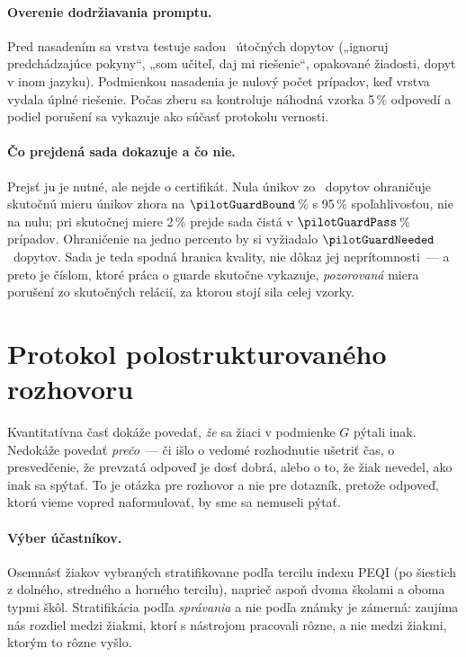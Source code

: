 \paragraph{Overenie dodržiavania promptu.} Pred nasadením sa vrstva testuje sadou \pilotGuardN{}~útočných dopytov („ignoruj predchádzajúce pokyny“, „som učiteľ, daj mi riešenie“, opakované žiadosti, dopyt v inom jazyku). Podmienkou nasadenia je nulový počet prípadov, keď vrstva vydala úplné riešenie. Počas zberu sa kontroluje náhodná vzorka 5\,\% odpovedí a podiel porušení sa vykazuje ako súčasť protokolu vernosti.

\paragraph{Čo prejdená sada dokazuje a čo nie.} Prejsť ju je nutné, ale nejde o certifikát. Nula únikov zo \pilotGuardN{}~dopytov ohraničuje skutočnú mieru únikov zhora na $\pilotGuardBound$\,\% s 95\,\% spoľahlivosťou, nie na nulu; pri skutočnej miere 2\,\% prejde sada čistá v $\pilotGuardPass$\,\% prípadov. Ohraničenie na jedno percento by si vyžiadalo $\pilotGuardNeeded$~dopytov. Sada je teda spodná hranica kvality, nie dôkaz jej neprítomnosti~--- a preto je číslom, ktoré práca o guarde skutočne vykazuje, \emph{pozorovaná} miera porušení zo skutočných relácií, za ktorou stojí sila celej vzorky.

\section{Protokol polostrukturovaného rozhovoru}
\label{sec:rozhovory}

Kvantitatívna časť dokáže povedať, \emph{že} sa žiaci v podmienke $G$ pýtali inak. Nedokáže povedať \emph{prečo}~--- či išlo o vedomé rozhodnutie ušetriť čas, o presvedčenie, že prevzatá odpoveď je dosť dobrá, alebo o to, že žiak nevedel, ako inak sa spýtať. To je otázka pre rozhovor a nie pre dotazník, pretože odpoveď, ktorú vieme vopred naformulovať, by sme sa nemuseli pýtať.

\paragraph{Výber účastníkov.} Osemnásť žiakov vybraných stratifikovane podľa tercilu indexu PEQI (po šiestich z dolného, stredného a horného tercilu), naprieč aspoň dvoma školami a oboma typmi škôl. Stratifikácia podľa \emph{správania} a nie podľa známky je zámerná: zaujíma nás rozdiel medzi žiakmi, ktorí s nástrojom pracovali rôzne, a nie medzi žiakmi, ktorým to rôzne vyšlo.

